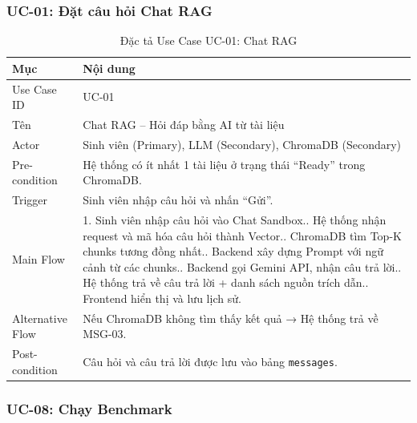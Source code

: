 \subsubsection{UC-01: Đặt câu hỏi Chat RAG}

\begin{table}[H]
  \centering
  \caption{Đặc tả Use Case UC-01: Chat RAG}
  \label{tab:uc01}
  \renewcommand{\arraystretch}{1.5}
  \begin{tabularx}{\textwidth}{|l|X|}
    \hline
    \rowcolor{blue!10}
    \textbf{Mục} & \textbf{Nội dung} \\
    \hline
    Use Case ID & UC-01 \\
    \hline
    Tên & Chat RAG -- Hỏi đáp bằng AI từ tài liệu \\
    \hline
    Actor & Sinh viên (Primary), LLM (Secondary), ChromaDB (Secondary) \\
    \hline
    Pre-condition & Hệ thống có ít nhất 1 tài liệu ở trạng thái ``Ready'' trong ChromaDB. \\
    \hline
    Trigger & Sinh viên nhập câu hỏi và nhấn ``Gửi''. \\
    \hline
    Main Flow &
      1. Sinh viên nhập câu hỏi vào Chat Sandbox.\newline
      2. Hệ thống nhận request và mã hóa câu hỏi thành Vector.\newline
      3. ChromaDB tìm Top-K chunks tương đồng nhất.\newline
      4. Backend xây dựng Prompt với ngữ cảnh từ các chunks.\newline
      5. Backend gọi Gemini API, nhận câu trả lời.\newline
      6. Hệ thống trả về câu trả lời + danh sách nguồn trích dẫn.\newline
      7. Frontend hiển thị và lưu lịch sử. \\
    \hline
    Alternative Flow & Nếu ChromaDB không tìm thấy kết quả → Hệ thống trả về MSG-03. \\
    \hline
    Post-condition & Câu hỏi và câu trả lời được lưu vào bảng \texttt{messages}. \\
    \hline
  \end{tabularx}
\end{table}

\subsubsection{UC-08: Chạy Benchmark}

